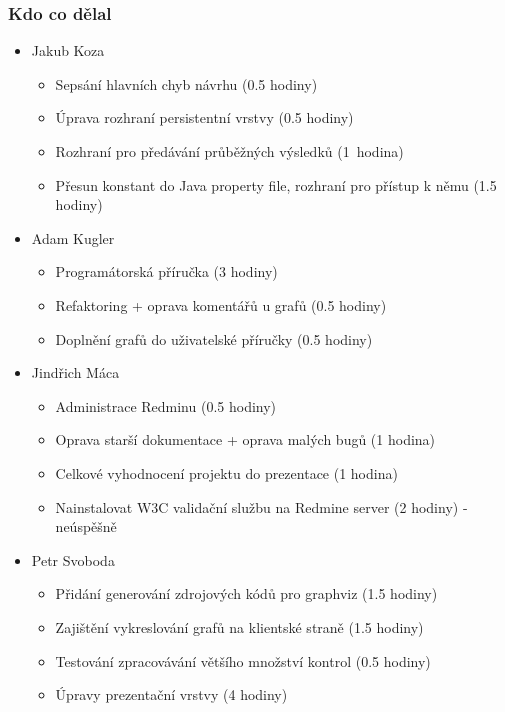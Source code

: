 \documentclass{beamer}
\begin{document}
\begin{frame}[allowframebreaks]\frametitle{Kdo co dělal} 
  \begin{itemize}
    \item Jakub Koza
      \begin{itemize}
       \item Sepsání hlavních chyb návrhu (0.5 hodiny)
	   \item Úprava rozhraní persistentní vrstvy (0.5 hodiny)
	   \item Rozhraní pro předávání průběžných výsledků 
(1~hodina)
       \item Přesun konstant do Java property file, rozhraní pro přístup k němu (1.5 hodiny)
     \end{itemize}

    \item Adam Kugler
      \begin{itemize}
       \item Programátorská příručka (3 hodiny)
       \item Refaktoring + oprava komentářů u grafů (0.5 hodiny)
       \item Doplnění grafů do uživatelské příručky (0.5 hodiny)
     \end{itemize}

    \item Jindřich Máca
      \begin{itemize}
       \item Administrace Redminu	(0.5 hodiny)	
			 \item Oprava starší dokumentace + oprava malých bugů (1 hodina)
			 \item Celkové vyhodnocení projektu do prezentace (1 hodina)
			 \item Nainstalovat W3C validační službu na Redmine server (2 hodiny) - neúspěšně
     \end{itemize}

    \item Petr Svoboda
      \begin{itemize}
	\item Přidání generování zdrojových kódů pro graphviz (1.5 hodiny)
	\item Zajištění vykreslování grafů na klientské straně (1.5 hodiny)
	\item Testování zpracovávání většího množství kontrol (0.5 hodiny)
	\item Úpravy prezentační vrstvy (4 hodiny)
     \end{itemize}
   \end{itemize}  
\end{frame} 
\end{document}
